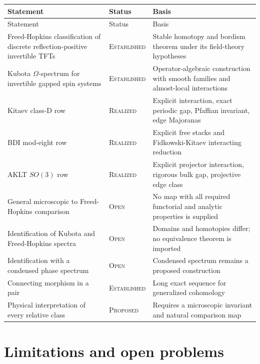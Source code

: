 \documentclass[12pt]{article}
\theoremstyle{definition}
\theoremstyle{remark}
\newcommand{\EST}{\textnormal{\textsc{Established}}}
\newcommand{\REAL}{\textnormal{\textsc{Realized}}}
\newcommand{\PROP}{\textnormal{\textsc{Proposed}}}
\newcommand{\OPEN}{\textnormal{\textsc{Open}}}
\begin{document}
\begin{longtable}{>{\raggedright\arraybackslash}p{}
                  >{\raggedright\arraybackslash}p{}
                  >{\raggedright\arraybackslash}p{}}
\toprule
Statement & Status & Basis \\
\midrule
\endfirsthead
\toprule
Statement & Status & Basis \\
\midrule
\endhead
Freed-Hopkins classification of discrete reflection-positive invertible TFTs
& \EST{} & Stable homotopy and bordism theorem under its field-theory hypotheses \\

Kubota $\Omega$-spectrum for invertible gapped spin systems
& \EST{} & Operator-algebraic construction with smooth families and almost-local interactions \\

Kitaev class-D row
& \REAL{} & Explicit interaction, exact periodic gap, Pfaffian invariant, edge Majoranas \\

BDI mod-eight row
& \REAL{} & Explicit free stacks and Fidkowski-Kitaev interacting reduction \\

AKLT $SO(3)$ row
& \REAL{} & Explicit projector interaction, rigorous bulk gap, projective edge class \\

General microscopic to Freed-Hopkins comparison
& \OPEN{} & No map with all required functorial and analytic properties is supplied \\

Identification of Kubota and Freed-Hopkins spectra
& \OPEN{} & Domains and homotopies differ; no equivalence theorem is imported \\

Identification with a condensed phase spectrum
& \OPEN{} & Condensed spectrum remains a proposed construction \\

Connecting morphism in a pair
& \EST{} & Long exact sequence for generalized cohomology \\

Physical interpretation of every relative class
& \PROP{} & Requires a microscopic invariant and natural comparison map \\
\bottomrule
\end{longtable}

\section{Limitations and open problems}
\end{document}
